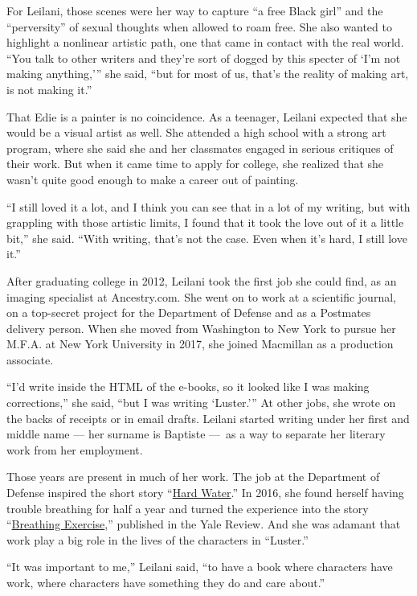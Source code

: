 For Leilani, those scenes were her way to capture ``a free Black girl''
and the ``perversity'' of sexual thoughts when allowed to roam free. She
also wanted to highlight a nonlinear artistic path, one that came in
contact with the real world. ``You talk to other writers and they're
sort of dogged by this specter of `I'm not making anything,''' she said,
``but for most of us, that's the reality of making art, is not making
it.''

That Edie is a painter is no coincidence. As a teenager, Leilani
expected that she would be a visual artist as well. She attended a high
school with a strong art program, where she said she and her classmates
engaged in serious critiques of their work. But when it came time to
apply for college, she realized that she wasn't quite good enough to
make a career out of painting.

``I still loved it a lot, and I think you can see that in a lot of my
writing, but with grappling with those artistic limits, I found that it
took the love out of it a little bit,'' she said. ``With writing, that's
not the case. Even when it's hard, I still love it.''

After graduating college in 2012, Leilani took the first job she could
find, as an imaging specialist at Ancestry.com. She went on to work at a
scientific journal, on a top-secret project for the Department of
Defense and as a Postmates delivery person. When she moved from
Washington to New York to pursue her M.F.A. at New York University in
2017, she joined Macmillan as a production associate.

``I'd write inside the HTML of the e-books, so it looked like I was
making corrections,'' she said, ``but I was writing `Luster.''' At other
jobs, she wrote on the backs of receipts or in email drafts. Leilani
started writing under her first and middle name --- her surname is
Baptiste ---~as a way to separate her literary work from her employment.

Those years are present in much of her work. The job at the Department
of Defense inspired the short story
``\href{https://cosmonautsavenue.com/raven-leilani-fiction/}{Hard
Water}.'' In 2016, she found herself having trouble breathing for half a
year and turned the experience into the story
``\href{https://cosmonautsavenue.com/raven-leilani-fiction/}{Breathing
Exercise},'' published in the Yale Review. And she was adamant that work
play a big role in the lives of the characters in ``Luster.''

``It was important to me,'' Leilani said, ``to have a book where
characters have work, where characters have something they do and care
about.''

